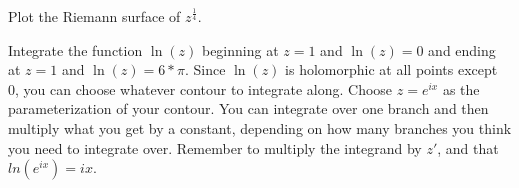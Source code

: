 \begin{problem}
Plot the Riemann surface of $z^{\frac{1}{4}}$.
\end{problem}

\begin{problem}
Integrate the function $\ln(z)$ beginning at $z=1$ and $\ln(z)=0$ and ending at $z=1$ and $\ln(z)=6*\pi$.
Since $\ln(z)$ is holomorphic at all points except 0, you can choose whatever contour to integrate along. Choose $z=e^{ix}$ as the parameterization of your contour. You can integrate over one branch and then multiply what you get by a constant, depending on how many branches you think you need to integrate over. Remember to multiply the integrand by $z'$, and that $ln(e^{ix})=ix$.
\end{problem}
